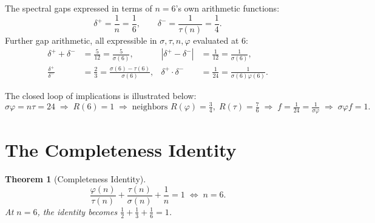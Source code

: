\documentclass[12pt]{article}
\newtheorem{theorem}{Theorem}[section]
\begin{document}
The spectral gaps expressed in terms of $n=6$'s own arithmetic functions:
\[
  \delta^+ = \frac{1}{n} = \frac{1}{6}, \qquad
  \delta^- = \frac{1}{\tau(n)} = \frac{1}{4}.
\]
Further gap arithmetic, all expressible in $\sigma,\tau,n,\varphi$ evaluated at $6$:
\begin{align*}
  \delta^++\delta^- &= \frac{5}{12} = \frac{5}{\sigma(6)}, &
  |\delta^+-\delta^-| &= \frac{1}{12} = \frac{1}{\sigma(6)}, \\
  \frac{\delta^+}{\delta^-} &= \frac{2}{3} = \frac{\sigma(6)-\tau(6)}{\sigma(6)}, &
  \delta^+\cdot\delta^- &= \frac{1}{24} = \frac{1}{\sigma(6)\varphi(6)}.
\end{align*}

The closed loop of implications is illustrated below:
\[
  \sigma\varphi = n\tau = 24
  \;\Rightarrow\; R(6)=1
  \;\Rightarrow\; \text{neighbors } R(\varphi)=\tfrac{3}{4},\;R(\tau)=\tfrac{7}{6}
  \;\Rightarrow\; f=\tfrac{1}{24}=\tfrac{1}{\sigma\varphi}
  \;\Rightarrow\; \sigma\varphi f = 1.
\]

\section{The Completeness Identity}
\label{sec:completeness}

\begin{theorem}[Completeness Identity]\label{thm:complete}
\[
  \frac{\varphi(n)}{\tau(n)} + \frac{\tau(n)}{\sigma(n)} + \frac{1}{n} = 1
  \;\iff\; n = 6.
\]
At $n=6$, the identity becomes $\frac{1}{2}+\frac{1}{3}+\frac{1}{6}=1$.
\end{theorem}
\end{document}

